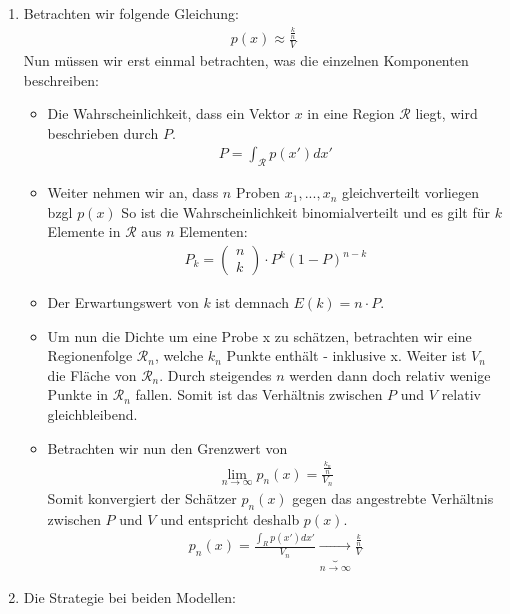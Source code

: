 \setcounter{section}{1}
\begin{aufgabe}
\end{aufgabe}
\begin{enumerate}
	\item Betrachten wir folgende Gleichung:
	\begin{align*}
		p(x) \approx \frac{\frac{k}{n}}{V}
	\end{align*}
	Nun müssen wir erst einmal betrachten, was die einzelnen Komponenten beschreiben:
	\begin{itemize}
		\item Die Wahrscheinlichkeit, dass ein Vektor $x$ in eine Region $\mathcal{R}$ liegt, wird beschrieben durch $P$.
		\begin{align*}
		P = \int_{\mathcal{R}} p(x') dx'
		\end{align*}
		\item Weiter nehmen wir an, dass $n$ Proben $x_1,...,x_n$ gleichverteilt vorliegen bzgl $p(x)$ So ist die Wahrscheinlichkeit binomialverteilt und es gilt für $k$ Elemente in $\mathcal{R}$ aus $n$ Elementen:
		\begin{align*}
		P_k = \begin{pmatrix}
		n \\ k
		\end{pmatrix}
			\cdot P^k (1-P)^{n-k}
		\end{align*}
		\item Der Erwartungswert von $k$ ist demnach $E(k) = n\cdot P$.
		\item Um nun die Dichte um eine Probe x zu schätzen, betrachten wir eine Regionenfolge $\mathcal{R}_n$, welche $k_n$ Punkte enthält - inklusive x. Weiter ist $V_n$ die Fläche von $\mathcal{R}_n$. Durch steigendes $n$ werden dann doch relativ wenige Punkte in $\mathcal{R}_n$ fallen. Somit ist das Verhältnis zwischen $P$ und $V$ relativ gleichbleibend.
		\item Betrachten wir nun den Grenzwert von 
		\begin{align*}
			\lim\limits_{n\to\infty}p_n(x) = \frac{\frac{k_n}{n} }{V_n}
		\end{align*}
		Somit konvergiert der Schätzer $p_n(x)$ gegen das angestrebte Verhältnis zwischen $P$ und $V$ und entspricht deshalb $p(x)$.	
		\begin{align*}
		    p_n(x) = \frac{\int_{R}p(x')dx'}{V_n} \underbrace{\to}_{n\to\infty} \frac{\frac{k}{n}}{V}
		\end{align*}
	\end{itemize}
	\item Die Strategie bei beiden Modellen:

\end{enumerate}
